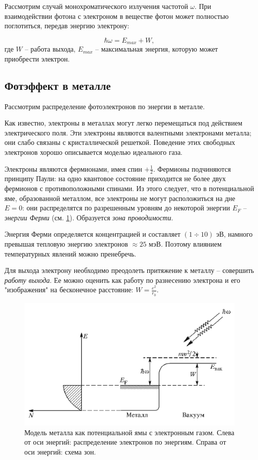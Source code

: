 \documentclass[a4paper, 12pt]{article} %
\begin{document}
	Рассмотрим случай монохроматического излучения частотой $\omega$. При взаимодействии фотона с электроном в веществе фотон может полностью поглотиться, передав энергию электрону:
	
	\begin{equation}
		\hbar \omega = E_{max} + W,
		\label{eq:basic}
	\end{equation}
	где $W$ -- работа выхода, $E_{max}$ -- максимальная энергия, которую может приобрести электрон. 
	
	\subsection{Фотэффект в металле}

	Рассмотрим распределение фотоэлектронов по энергии в металле.
	
	Как известно, электроны в металлах могут легко перемещаться под действием электрического поля. Эти электроны являются валентными электронами металла; они слабо связаны с кристаллической решеткой. Поведение этих свободных электронов хорошо описывается моделью идеального газа.
	
	Электроны являются фермионами, имея спин $+\frac{1}{2}$. Фермионы подчиняются принципу Паули: на одно квантовое состояние приходится не более двух фермионов с противоположными спинами. Из этого следует, что в потенциальной яме, образованной металлом, все электроны не могут расположиться на дне $E = 0$: они распределятся по разрешенным уровням до некоторой энергии $E_F$ -- \textit{энергии Ферми} (см. \ref{fig:metal}). Образуется \textit{зона проводимости}.
	
	Энергия Ферми определяется концентрацией и составляет $(1\div10)$ эВ, намного превышая тепловую энергию электронов $\approx 25$ мэВ. Поэтому влиянием температурных явлений можно пренебречь.
	
	Для выхода электрону необходимо преодолеть притяжение к металлу -- совершить \textit{работу выхода}. Ее можно оценить как работу по разнесению электрона и его "изображения" на бесконечное расстояние: $W = \frac{e^2}{r_0}$.
	
	\begin{figure}[h!]
		\centering
		\includegraphics[scale=0.5]{res/metal.png}
		\caption{\centering
				 Модель металла как потенциальной ямы с электронным газом.
				 Слева от оси энергий: распределение электронов по энергиям.
				 Справа от оси энергий: схема зон.}
		\label{fig:metal}
	\end{figure}
	
\end{document}
